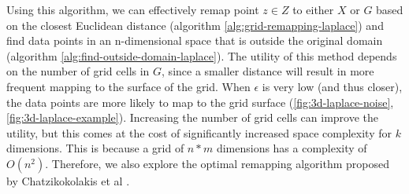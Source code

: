 Using this algorithm, we can effectively remap point $z \in Z$ to either $X$ or $G$ based on the closest Euclidean distance (algorithm \ref{alg:grid-remapping-laplace}) and find data points in an n-dimensional space that is outside the original domain (algorithm \ref{alg:find-outside-domain-laplace}).
The utility of this method depends on the number of grid cells in $G$, since a smaller distance will result in more frequent mapping to the surface of the grid.
When $\epsilon$ is very low (and thus closer), the data points are more likely to map to the grid surface (\ref{fig:3d-laplace-noise}, \ref{fig:3d-laplace-example}).
Increasing the number of grid cells can improve the utility, but this comes at the cost of significantly increased space complexity for $k$ dimensions.
This is because a grid of $n*m$ dimensions has a complexity of $O(n^2)$.
Therefore, we also explore the optimal remapping algorithm proposed by Chatzikokolakis et al \citep{chatzikokolakis_efficient_2017}.



